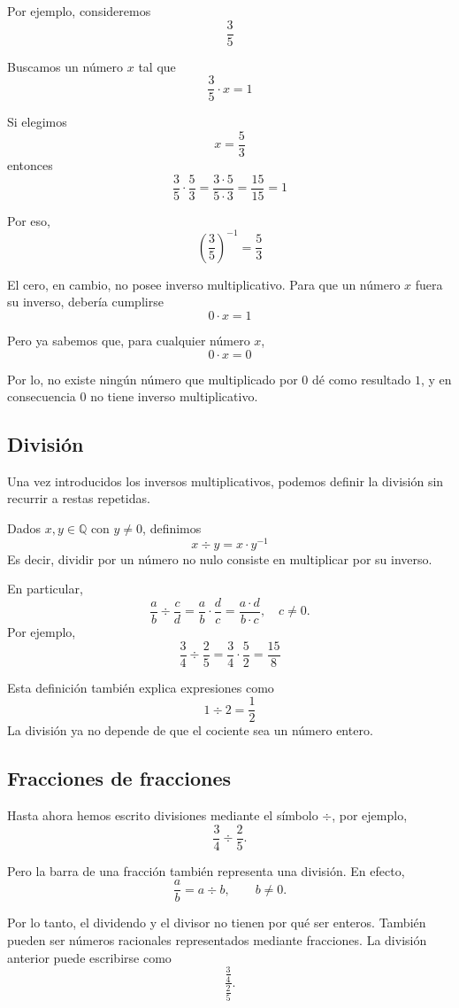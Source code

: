 Por ejemplo, consideremos
\[
\frac{3}{5}
\]

Buscamos un número \(x\) tal que
\[
\frac{3}{5}\cdot x=1
\]

Si elegimos
\[
x=\frac{5}{3}
\]
entonces
\[
\frac{3}{5}\cdot\frac{5}{3}
=
\frac{3\cdot5}{5\cdot3}
=
\frac{15}{15}
=
1
\]

Por eso,
\[
\left(\frac35\right)^{-1}
=
\frac53
\]

El cero, en cambio, no posee inverso multiplicativo. Para que un número \(x\) fuera su inverso, debería cumplirse
\[
0\cdot x=1
\]

Pero ya sabemos que, para cualquier número \(x\),
\[
0\cdot x=0
\]

Por lo, no existe ningún número que multiplicado por \(0\) dé como resultado \(1\), y en consecuencia \(0\) no tiene inverso multiplicativo.

\subsection{División}

Una vez introducidos los inversos multiplicativos, podemos definir la división sin recurrir a restas repetidas.

Dados \(x,y\in\mathbb{Q}\) con \(y\ne0\), definimos
\[
\boxed{x\div y=x\cdot y^{-1}}
\]
Es decir, dividir por un número no nulo consiste en multiplicar por su inverso.

En particular,
\[
\frac{a}{b}\div\frac{c}{d}
=
\frac{a}{b}\cdot\frac{d}{c}
=
\frac{a\cdot d}{b\cdot c},
\quad c\ne0.
\]
Por ejemplo,
\[
\frac34\div\frac25
=
\frac34\cdot\frac52
=
\frac{15}{8}
\]

Esta definición también explica expresiones como
\[
1\div2=\frac12
\]
La división ya no depende de que el cociente sea un número entero.

\subsection{Fracciones de fracciones}

Hasta ahora hemos escrito divisiones mediante el símbolo \(\div\), por ejemplo,
\[
\frac34\div\frac25.
\]

Pero la barra de una fracción también representa una división. En efecto,
\[
\frac ab=a\div b,
\qquad b\ne0.
\]

Por lo tanto, el dividendo y el divisor no tienen por qué ser enteros. También
pueden ser números racionales representados mediante fracciones. La división
anterior puede escribirse como
\[
\frac{\frac34}{\frac25}.
\]

